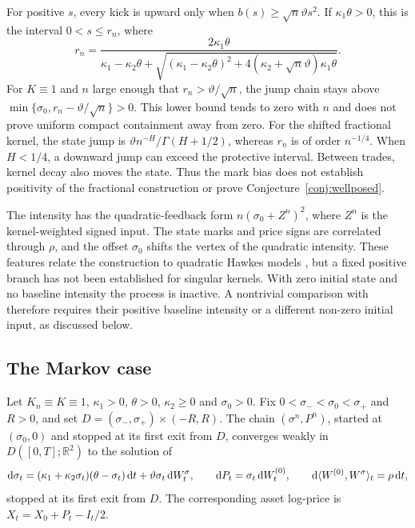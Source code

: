 For positive $s$, every kick is upward only when $b(s)\ge\sqrt n\vartheta s^2$. If $\kappa_1\theta>0$, this is the interval $0<s\le r_n$, where
\begin{equation*}
r_n=\frac{2\kappa_1\theta}{\kappa_1-\kappa_2\theta+\sqrt{(\kappa_1-\kappa_2\theta)^2+4(\kappa_2+\sqrt n\vartheta)\kappa_1\theta}}.
\end{equation*}
For $K\equiv1$ and $n$ large enough that $r_n>\vartheta/\sqrt n$, the jump chain stays above $\min\{\sigma_0,r_n-\vartheta/\sqrt n\}>0$. This lower bound tends to zero with $n$ and does not prove uniform compact containment away from zero. For the shifted fractional kernel, the state jump is $\vartheta n^{-H}/\Gamma(H+1/2)$, whereas $r_n$ is of order $n^{-1/4}$. When $H<1/4$, a downward jump can exceed the protective interval. Between trades, kernel decay also moves the state. Thus the mark bias does not establish positivity of the fractional construction or prove Conjecture~\ref{conj:wellposed}.

The intensity has the quadratic-feedback form $n(\sigma_0+Z^n)^2$, where $Z^n$ is the kernel-weighted signed input. The state marks and price signs are correlated through $\rho$, and the offset $\sigma_0$ shifts the vertex of the quadratic intensity. These features relate the construction to quadratic Hawkes models \citep{BlancDonierBouchaud2017}, but a fixed positive branch has not been established for singular kernels. With zero initial state and no baseline intensity the process is inactive. A nontrivial comparison with \citet{DandapaniJusselinRosenbaum2021} therefore requires their positive baseline intensity or a different non-zero initial input, as discussed below.

\subsection{The Markov case}\label{sec:micro_markov}

\begin{proposition}\label{prop:markov}
Let $K_n\equiv K\equiv1$, $\kappa_1>0$, $\theta>0$, $\kappa_2\ge0$ and $\sigma_0>0$. Fix $0<\sigma_-<\sigma_0<\sigma_+$ and $R>0$, and set $D=(\sigma_-,\sigma_+)\times(-R,R)$. The chain $(\sigma^n,P^n)$, started at $(\sigma_0,0)$ and stopped at its first exit from $D$, converges weakly in $D([0,T];\mathbb R^2)$ to the solution of
\begin{equation}\label{eq:markov_limit}
\D\sigma_t=(\kappa_1+\kappa_2\sigma_t)(\theta-\sigma_t)\,\D t+\vartheta\sigma_t\,\D W^\sigma_t,\qquad \D P_t=\sigma_t\,\D W^{(0)}_t,\qquad \D\langle W^{(0)},W^\sigma\rangle_t=\rho\,\D t,
\end{equation}
stopped at its first exit from $D$. The corresponding asset log-price is $X_t=X_0+P_t-I_t/2$.
\end{proposition}

